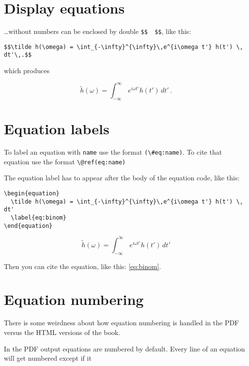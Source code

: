 \documentclass[]{book}
\begin{document}
\hypertarget{display-equations}{%
\section{Display equations}\label{display-equations}}

\ldots{}without numbers can be enclosed by double \texttt{\$\$\ \ \$\$}, like this:

\begin{verbatim}
$$\tilde h(\omega) = \int_{-\infty}^{\infty}\,e^{i\omega t'} h(t') \, dt'\,.$$
\end{verbatim}

which produces

\[\tilde h(\omega) = \int_{-\infty}^{\infty}\,e^{i\omega t'} h(t') \, dt'\,.\]

\hypertarget{equation-labels}{%
\section{Equation labels}\label{equation-labels}}

To label an equation with \texttt{name} use the format \texttt{(\textbackslash{}\#eq:name)}.
To cite that equation use the format \texttt{\textbackslash{}@ref(eq:name)}

The equation label has to appear after the body of the equation code, like this:

\begin{verbatim}
\begin{equation} 
  \tilde h(\omega) = \int_{-\infty}^{\infty}\,e^{i\omega t'} h(t') \, dt'
  \label{eq:binom}
\end{equation} 
\end{verbatim}

\begin{equation}
  \tilde h(\omega) = \int_{-\infty}^{\infty}\,e^{i\omega t'} h(t') \, dt'
  \label{eq:binom}
\end{equation}

Then you can cite the equation, like this: \eqref{eq:binom}.

\hypertarget{equation-numbering}{%
\section{Equation numbering}\label{equation-numbering}}

There is some weirdness about how equation numbering is handled in the PDF versus the HTML versions of the book.

In the PDF output equations are numbered by default. Every line of an equation will get numbered except if it
\end{document}
